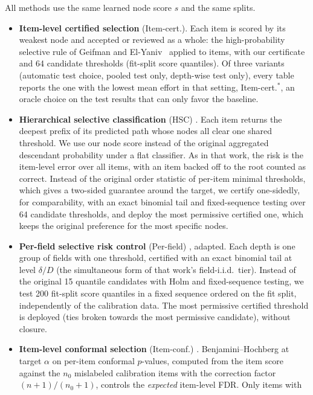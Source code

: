 \documentclass[preprint,12pt]{elsarticle}
\theoremstyle{definition}
\begin{document}
All methods use the same learned node score $s$ and the same splits.
\begin{itemize}
  \item \textbf{Item-level certified selection} (Item-cert.). Each item is
  scored by its weakest node and accepted or reviewed as a whole: the
  high-probability selective rule of Geifman and El-Yaniv~\cite{geifman2017selective}
  applied to items, with our certificate and 64 candidate thresholds (fit-split
  score quantiles). Of three variants (automatic test choice, pooled test only,
  depth-wise test only), every table reports the one with the lowest mean effort
  in that setting, Item-cert.$^\ast$, an oracle choice on the test results that
  can only favor the baseline.
  \item \textbf{Hierarchical selective classification} (HSC)
  \citep{goren2024hierarchical}. Each item returns the deepest prefix of its
  predicted path whose nodes all clear one shared threshold. We use our node
  score instead of the original aggregated descendant probability under a flat
  classifier. As in that work, the risk is the item-level error over all items,
  with an item backed off to the root counted as correct. Instead of the
  original order statistic of per-item minimal thresholds, which gives a
  two-sided guarantee around the target, we certify one-sidedly, for
  comparability, with an exact binomial tail and fixed-sequence testing over 64
  candidate thresholds, and deploy the most permissive certified one, which
  keeps the original preference for the most specific nodes.
  \item \textbf{Per-field selective risk control} (Per-field)
  \citep{gurram2026perfield}, adapted. Each depth is one group of fields with one
  threshold, certified with an exact binomial tail at level $\delta/D$ (the
  simultaneous form of that work's field-i.i.d.\ tier). Instead of the original
  15 quantile candidates with Holm and fixed-sequence testing, we test 200
  fit-split score quantiles in a fixed sequence ordered on the fit split,
  independently of the calibration data. The most permissive certified
  threshold is deployed (ties broken towards the most permissive candidate),
  without closure.
  \item \textbf{Item-level conformal selection} (Item-conf.)
  \citep{huang2025selective,jin2023selection}. Benjamini--Hochberg at target
  $\alpha$ on per-item conformal $p$-values, computed from the item score
  against the $n_0$ mislabeled calibration items with the correction factor
  $(n+1)/(n_0+1)$, controls the \emph{expected} item-level FDR. Only items with

\end{itemize}
\end{document}
